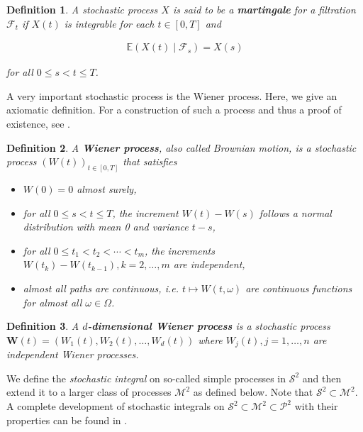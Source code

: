\documentclass[a4paper]{article}
\newtheorem{definition}{Definition}[section]
\begin{document}
\begin{definition}
  A stochastic process $X$ is said to be a \textbf{martingale} for a filtration $\mathcal{F}_t$ if $X(t)$ is integrable for each $t \in [0,T]$ and

  \begin{align*}
    \mathbb{E}(X(t) \mid \mathcal{F}_s) = X(s)
  \end{align*}

  for all $0 \le s < t \le T$.
\end{definition}

A very important stochastic process is the Wiener process. Here, we give an axiomatic definition. For a construction of such a process and thus a proof of existence, see \textcite{capinski_stochastic_2012}.

\begin{definition}
  A \textbf{Wiener process}, also called Brownian motion, is a stochastic process $(W(t))_{t \in [0,T]}$ that satisfies

  \begin{itemize}
    \item $W(0) = 0$ almost surely,
    \item for all $0 \le s < t \le T$, the increment $W(t) - W(s)$ follows a normal distribution with mean 0 and variance $t - s$,
    \item for all $0 \le t_1 < t_2 < \cdots < t_m$, the increments $W(t_k) - W(t_{k-1}), k=2,\ldots,m$ are independent,
    \item almost all paths are continuous, i.e. $t \mapsto W(t,\omega)$ are continuous functions for almost all $\omega \in \Omega$.
  \end{itemize}
\end{definition}

\begin{definition}
  A \textbf{$d$-dimensional Wiener process} is a stochastic process $\mathbf{W}(t) = (W_1(t), W_2(t), \ldots, W_d(t))$ where $W_j(t), j=1,\ldots,n$ are independent Wiener processes.
\end{definition}

We define the \textit{stochastic integral} on so-called simple processes in $\mathcal{S}^2$ and then extend it to a larger class of processes $\mathcal{M}^2$ as defined below. Note that $\mathcal{S}^2 \subset \mathcal{M}^2$. A complete development of stochastic integrals on $\mathcal{S}^2 \subset \mathcal{M}^2 \subset \mathcal{P}^2$ with their properties can be found in \textcite{capinski_stochastic_2012}.
\end{document}

